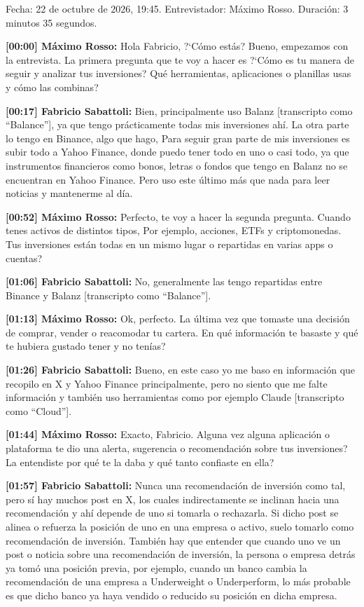 Fecha: 22 de octubre de 2026, 19:45. Entrevistador: Máximo Rosso. Duración: 3 minutos 35 segundos.
\par\noindent\textbf{[00:00] Máximo Rosso:} Hola Fabricio, ?`Cómo estás? Bueno, empezamos con la entrevista. La primera pregunta que te voy a hacer es ?`Cómo es tu manera de seguir y analizar tus inversiones? Qué herramientas, aplicaciones o planillas usas y cómo las combinas?
\par\noindent\textbf{[00:17] Fabricio Sabattoli:} Bien, principalmente uso Balanz [transcripto como \enquote{Balance}], ya que tengo prácticamente todas mis inversiones ahí. La otra parte lo tengo en Binance, algo que hago, Para seguir gran parte de mis inversiones es subir todo a Yahoo Finance, donde puedo tener todo en uno o casi todo, ya que instrumentos financieros como bonos, letras o fondos que tengo en Balanz no se encuentran en Yahoo Finance. Pero uso este último más que nada para leer noticias y mantenerme al día.
\par\noindent\textbf{[00:52] Máximo Rosso:} Perfecto, te voy a hacer la segunda pregunta. Cuando tenes activos de distintos tipos, Por ejemplo, acciones, ETFs y criptomonedas. Tus inversiones están todas en un mismo lugar o repartidas en varias apps o cuentas?
\par\noindent\textbf{[01:06] Fabricio Sabattoli:} No, generalmente las tengo repartidas entre Binance y Balanz [transcripto como \enquote{Balance}].
\par\noindent\textbf{[01:13] Máximo Rosso:} Ok, perfecto. La última vez que tomaste una decisión de comprar, vender o reacomodar tu cartera. En qué información te basaste y qué te hubiera gustado tener y no tenías?
\par\noindent\textbf{[01:26] Fabricio Sabattoli:} Bueno, en este caso yo me baso en información que recopilo en X y Yahoo Finance principalmente, pero no siento que me falte información y también uso herramientas como por ejemplo Claude [transcripto como \enquote{Cloud}].
\par\noindent\textbf{[01:44] Máximo Rosso:} Exacto, Fabricio. Alguna vez alguna aplicación o plataforma te dio una alerta, sugerencia o recomendación sobre tus inversiones? La entendiste por qué te la daba y qué tanto confiaste en ella?
\par\noindent\textbf{[01:57] Fabricio Sabattoli:} Nunca una recomendación de inversión como tal, pero sí hay muchos post en X, los cuales indirectamente se inclinan hacia una recomendación y ahí depende de uno si tomarla o rechazarla. Si dicho post se alinea o refuerza la posición de uno en una empresa o activo, suelo tomarlo como recomendación de inversión. También hay que entender que cuando uno ve un post o noticia sobre una recomendación de inversión, la persona o empresa detrás ya tomó una posición previa, por ejemplo, cuando un banco cambia la recomendación de una empresa a Underweight o Underperform, lo más probable es que dicho banco ya haya vendido o reducido su posición en dicha empresa.
